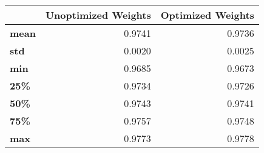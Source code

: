 \begin{tabular}{lrr}
\toprule
{} &  Unoptimized Weights &  Optimized Weights \\
\midrule
\textbf{mean} &               0.9741 &             0.9736 \\
\textbf{std } &               0.0020 &             0.0025 \\
\textbf{min } &               0.9685 &             0.9673 \\
\textbf{25\% } &               0.9734 &             0.9726 \\
\textbf{50\% } &               0.9743 &             0.9741 \\
\textbf{75\% } &               0.9757 &             0.9748 \\
\textbf{max } &               0.9773 &             0.9778 \\
\bottomrule
\end{tabular}
